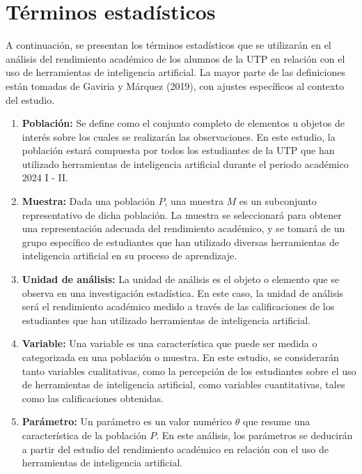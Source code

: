 \documentclass{article}
\newenvironment{terminosEstadisticos}{}{}
\begin{document}
\newpage

\begin{terminosEstadisticos}
  \section{Términos estadísticos}

  A continuación, se presentan los términos estadísticos que se utilizarán en el análisis del rendimiento académico de los alumnos de la UTP en relación con el uso de herramientas de inteligencia artificial. La mayor parte de las definiciones están tomadas de Gaviria y Márquez (2019), con ajustes específicos al contexto del estudio.
  
  \begin{enumerate}
    \item \textbf{Población:} Se define como el conjunto completo de elementos u objetos de interés sobre los cuales se realizarán las observaciones. En este estudio, la población estará compuesta por todos los estudiantes de la UTP que han utilizado herramientas de inteligencia artificial durante el periodo académico 2024 I - II.
  
    \item \textbf{Muestra:} Dada una población $P$, una muestra $M$ es un subconjunto representativo de dicha población. La muestra se seleccionará para obtener una representación adecuada del rendimiento académico, y se tomará de un grupo específico de estudiantes que han utilizado diversas herramientas de inteligencia artificial en su proceso de aprendizaje.
  
    \item \textbf{Unidad de análisis:} La unidad de análisis es el objeto o elemento que se observa en una investigación estadística. En este caso, la unidad de análisis será el rendimiento académico medido a través de las calificaciones de los estudiantes que han utilizado herramientas de inteligencia artificial.
  
    \item \textbf{Variable:} Una variable es una característica que puede ser medida o categorizada en una población o muestra. En este estudio, se considerarán tanto variables cualitativas, como la percepción de los estudiantes sobre el uso de herramientas de inteligencia artificial, como variables cuantitativas, tales como las calificaciones obtenidas.
  
    \item \textbf{Parámetro:} Un parámetro es un valor numérico $\theta$ que resume una característica de la población $P$. En este análisis, los parámetros se deducirán a partir del estudio del rendimiento académico en relación con el uso de herramientas de inteligencia artificial.
  

\end{enumerate}
\end{terminosEstadisticos}
\end{document}
